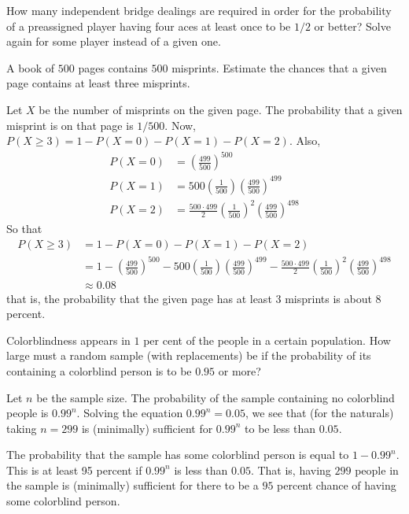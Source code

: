 \begin{problem}[Handout 8, \# 12]
  How many independent bridge dealings are required in order for the
  probability of a preassigned player having four aces at least once to be
  \(1/2\) or better? Solve again for some player instead of a given one.
\end{problem}
\begin{solution}
\end{solution}
\newpage

\begin{problem}[Handout 8, \# 13]
  A book of \(500\) pages contains \(500\) misprints. Estimate the chances
  that a given page contains at least three misprints.
\end{problem}
\begin{solution}
  Let $X$ be the number of misprints on the given page. The probability
  that a given misprint is on that page is $1/500$. Now,
  $P(X \geq 3) = 1- P(X=0) - P(X=1) - P(X=2)$. Also,
  \begin{align*}
    P(X=0) &= \left(\frac{499}{500}\right)^{500}\\
    P(X=1) &= 500\left(\frac{1}{500}\right)\left(\frac{499}{500}\right)^{499} \\
    P(X=2) &= \frac{500 \cdot 499}{2}\left(\frac{1}{500}\right)^2\left(\frac{499}{500}\right)^{498}
  \end{align*}
  So that
  \begin{align*}
    P(X \geq 3) &= 1- P(X=0) - P(X=1) - P(X=2)\\
                &= 1- \left(\frac{499}{500}\right)^{500} - 500\left(\frac{1}{500}\right)\left(\frac{499}{500}\right)^{499} - \frac{500 \cdot 499}{2}\left(\frac{1}{500}\right)^2\left(\frac{499}{500}\right)^{498}\\
                &\approx 0.08
  \end{align*}
  that is, the probability that the given page has at least \(3\) misprints
  is about \(8\) percent.
\end{solution}

\newpage

\begin{problem}[Handout 8, \# 14]
  Colorblindness appears in \(1\) per cent of the people in a certain
  population. How large must a random sample (with replacements) be if the
  probability of its containing a colorblind person is to be \(0.95\) or more?
\end{problem}
\begin{solution}
  Let $n$ be the sample size. The probability of the sample containing no
  colorblind people is $0.99^n$. Solving the equation $0.99^n=0.05$, we see
  that (for the naturals) taking $n = 299$ is (minimally) sufficient for
  $0.99^n$ to be less than $0.05$.

  The probability that the sample has some colorblind person is equal to
  $1-0.99^n$. This is at least 95 percent if $0.99^n$ is less than
  $0.05$. That is, having $299$ people in the sample is (minimally)
  sufficient for there to be a \(95\) percent chance of having some
  colorblind person.
\end{solution}
\newpage


